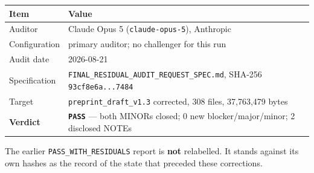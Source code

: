 \documentclass[
  9pt,
  a4paper,
]{article}
\newcounter{none} %
\begin{document}
{\def\LTcaptype{none} %
\begin{longtable}[]{@{}ll@{}}
\toprule\noalign{}
Item & Value \\
\midrule\noalign{}
\endhead
\bottomrule\noalign{}
\endlastfoot
Auditor & Claude Opus 5 (\texttt{claude-opus-5}), Anthropic \\
Configuration & primary auditor; no challenger for this run \\
Audit date & 2026-08-21 \\
Specification & \texttt{FINAL\_RESIDUAL\_AUDIT\_REQUEST\_SPEC.md},
SHA-256 \texttt{93cf8e6a...7484} \\
Target & \texttt{preprint\_draft\_v1.3} corrected, 308 files, 37,763,479
bytes \\
\textbf{Verdict} & \textbf{\texttt{PASS}} --- both MINORs closed; 0 new
blocker/major/minor; 2 disclosed NOTEs \\
\end{longtable}
}

The earlier \texttt{PASS\_WITH\_RESIDUALS} report is \textbf{not}
relabelled. It stands against its own hashes as the record of the state
that preceded these corrections.
\end{document}
